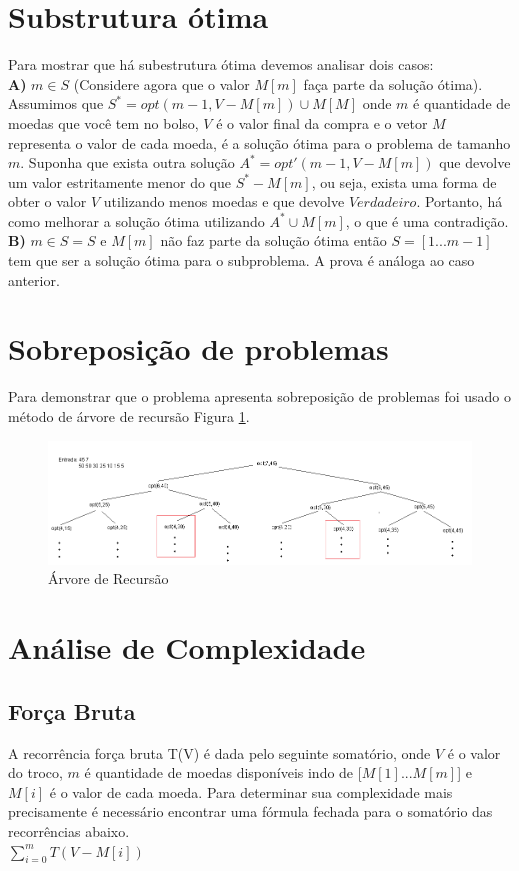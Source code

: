 \documentclass[12pt]{article}
\begin{document}
\section{Substrutura ótima}
Para mostrar que há subestrutura ótima devemos analisar dois casos:\\
\textbf{A)} $m \in S$ (Considere agora que o valor $M[m]$ faça parte da solução ótima). Assumimos que $S^{*} = opt(m-1,V - M[m]) \cup M[M]$ onde $m$ é quantidade de moedas que você tem no bolso, $V$ é o valor final da compra e o vetor $M$ representa o valor de cada moeda, é a solução ótima para o problema de tamanho $m$. Suponha que exista outra solução $A^{*} = opt'(m-1,V -M[m])$ que devolve um valor estritamente menor do que $S^{*} - M[m]$, ou seja, exista uma forma de obter o valor $V$ utilizando menos moedas e que devolve $Verdadeiro$. Portanto, há como melhorar a solução ótima utilizando $A^{*}\cup M[m]$, o que é uma contradição.\\ 
\textbf{B)} $m \in S = S$ e $M[m]$ não faz parte da solução ótima então $S = [1...m-1]$ tem que ser a solução ótima para o subproblema. A prova é análoga ao caso anterior.
\section{Sobreposição de problemas}
Para demonstrar que o problema apresenta sobreposição de problemas foi usado o método de árvore de recursão Figura \ref{fig:arvore}.
\begin{figure}[h]
\centering
\includegraphics[width=.9\textwidth]{arvore.png}
\caption{Árvore de Recursão\label{fig:arvore}}
\end{figure}
\section{Análise de Complexidade}
\subsection{Força Bruta}
A recorrência força bruta T(V) é dada pelo seguinte somatório, onde $V$ é o valor do troco, $m$ é quantidade de moedas disponíveis indo de [$M[1]$...$M[m]$] e $M[i]$ é o valor de cada moeda. Para determinar sua complexidade mais precisamente é necessário encontrar uma fórmula fechada para o somatório das recorrências abaixo.\\
$\displaystyle\sum_{i=0}^{m} T(V - M[i])$
\end{document}
